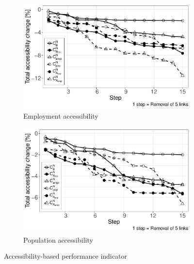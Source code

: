 \documentclass[]{elsarticle} %
\begin{document}
\begin{figure}[h!]
\centering
    \begin{subfigure}{.7\textwidth}
        \centering
        \includegraphics[width=1\linewidth]{Plots/acc_emp_5.pdf}  
        \caption{Employment accessibility}
        \label{acc-diff5a}
    \end{subfigure}
    \begin{subfigure}{.7\textwidth}
        \centering
        \includegraphics[width=1\linewidth]{Plots/acc_pop_5.pdf}  
        \caption{Population accessibility}
        \label{acc-diff5b}
    \end{subfigure}
    \caption{Accessibility-based performance indicator}
    \label{acc-diff5}
\end{figure}
\end{document}
